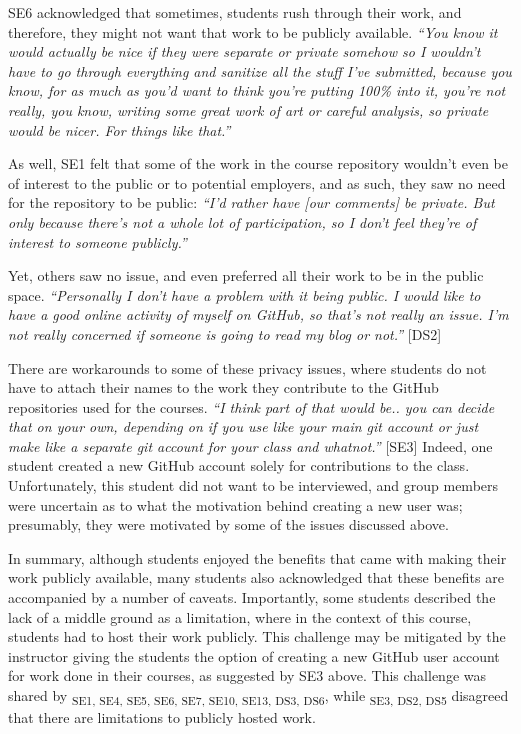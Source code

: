 SE6 acknowledged that sometimes, students rush through their work, and therefore, they might not want that work to be publicly available. \textit{``You know it would actually be nice if they were separate or private somehow so I wouldn't have to go through everything and sanitize all the stuff I've submitted, because you know, for as much as you'd want to think you're putting 100\% into it, you're not really, you know, writing some great work of art or careful analysis, so private would be nicer. For things like that.''}

As well, SE1 felt that some of the work in the course repository wouldn't even be of interest to the public or to potential employers, and as such, they saw no need for the repository to be public: \textit{``I'd rather have [our comments] be private. But only because there's not a whole lot of participation, so I don't feel they're of interest to someone publicly.''}


Yet, others saw no issue, and even preferred all their work to be in the public space. \textit{``Personally I don't have a problem with it being public. I would like to have a good online activity of myself on GitHub, so that's not really an issue. I'm not really concerned if someone is going to read my blog or not.''} [DS2]

There are workarounds to some of these privacy issues, where students do not have to attach their names to the work they contribute to the GitHub repositories used for the courses. \textit{``I think part of that would be.. you can decide that on your own, depending on if you use like your main git account or just make like a separate git account for your class and whatnot.''} [SE3] Indeed, one student created a new GitHub account solely for contributions to the class. Unfortunately, this student did not want to be interviewed, and group members were uncertain as to what the motivation behind creating a new user was; presumably, they were motivated by some of the issues discussed above.

In summary, although students enjoyed the benefits that came with making their work publicly available, many students also acknowledged that these benefits are accompanied by a number of caveats. Importantly, some students described the lack of a middle ground as a limitation, where in the context of this course, students had to host their work publicly. This challenge may be mitigated by the instructor giving the students the option of creating a new GitHub user account for work done in their courses, as suggested by SE3 above. This challenge was shared by \textsubscript{SE1, SE4, SE5, SE6, SE7, SE10, SE13, DS3, DS6}, while \textsubscript{SE3, DS2, DS5} disagreed that there are limitations to publicly hosted work. \\


